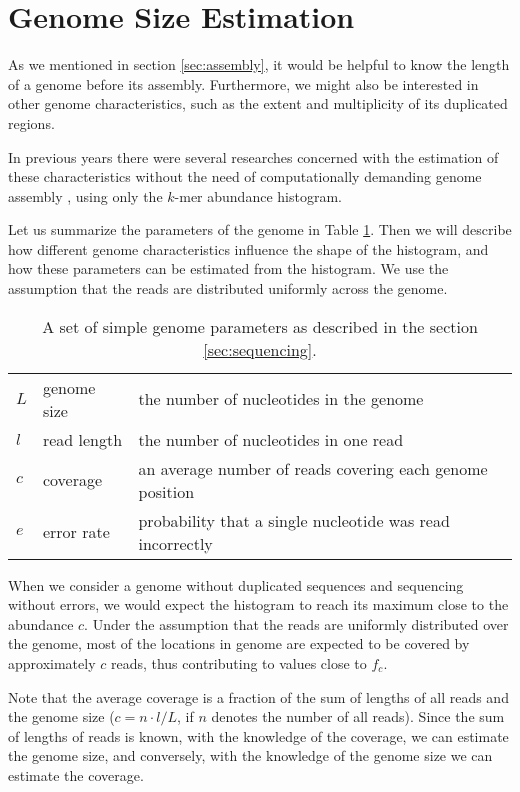 \section{Genome Size Estimation}
\label{sec:intro-estimation}
As we mentioned in section \ref{sec:assembly}, it would be helpful to know the length of a genome 
before its assembly. Furthermore, we might also be interested in other genome characteristics,
such as the extent and multiplicity of its duplicated regions.

In previous years there were several researches concerned with the estimation 
of these characteristics without the need of computationally demanding 
genome assembly \cite{Hozza2015, Williams2013, Melsted2014, Sivadasan2016}, using only the $k$-mer 
abundance histogram.

\medskip

Let us summarize the parameters of the genome in Table \ref{tab:genome-parameters}.
Then we will describe how different genome characteristics influence the shape of the histogram,
and how these parameters can be estimated from the histogram. We use the assumption that
the reads are distributed uniformly across the genome. 

\begin{table}[h!]
\centering
\begin{tabular}{ l l l }
 $L$ & genome size & the number of nucleotides in the genome \\  
 $l$ & read length & the number of nucleotides in one read \\
 $c$ & coverage & an average number of reads covering each genome position \\ 
 $e$ & error rate & probability that a single nucleotide was read incorrectly   
\end{tabular}
\caption[Genome parameters]{A set of simple genome parameters as described in the section \ref{sec:sequencing}.}
\label{tab:genome-parameters}
\end{table}

When we consider a genome without duplicated sequences and sequencing without errors, we
would expect the histogram to reach its maximum close to the abundance $c$.
Under the assumption that the reads are uniformly distributed over the genome,
most of the locations in genome are expected to be covered by approximately $c$ reads,
thus contributing to values close to $f_c$.

Note that the average coverage is a fraction of the sum of lengths of all reads
and the genome size ($c = n \cdot l/L$, if $n$ denotes the number of all reads). 
Since the sum of lengths of reads is known, with the knowledge of the coverage, we can estimate the 
genome size, and conversely, with the knowledge of the genome size we can estimate the coverage.

